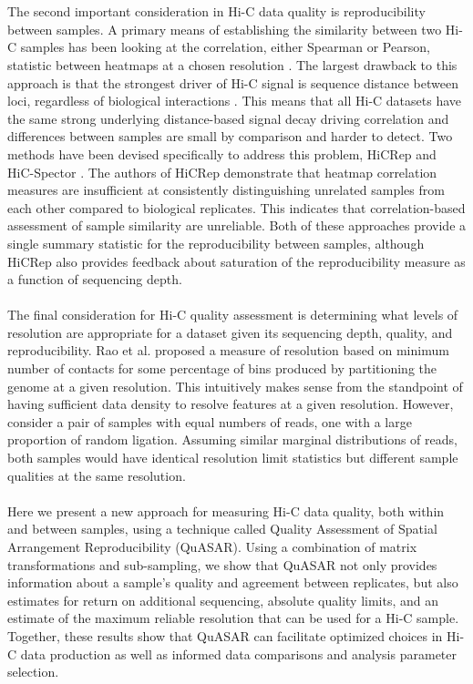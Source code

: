 \\\\
The second important consideration in Hi-C data quality is reproducibility between samples. A primary means of establishing the similarity between two Hi-C samples has been looking at the correlation, either Spearman or Pearson, statistic between heatmaps at a chosen resolution \cite{hou_gene_2012,battulin_comparison_2015,crane_condensin-driven_2015,li_widespread_2015,nagano_comparison_2015,rao_3d_2014}. The largest drawback to this approach is that the strongest driver of Hi-C signal is sequence distance between loci, regardless of biological interactions \cite{lieberman-aiden_comprehensive_2009}. This means that all Hi-C datasets have the same strong underlying distance-based signal decay driving correlation and differences between samples are small by comparison and harder to detect. Two methods have been devised specifically to address this problem, HiCRep \cite{yang_hicrep:_2017} and HiC-Spector \cite{yan_hic-spector:_2017}. The authors of HiCRep demonstrate that heatmap correlation measures are insufficient at consistently distinguishing unrelated samples from each other compared to biological replicates. This indicates that correlation-based assessment of sample similarity are unreliable. Both of these approaches provide a single summary statistic for the reproducibility between samples, although HiCRep also provides feedback about saturation of the reproducibility measure as a function of sequencing depth.
\\\\
The final consideration for Hi-C quality assessment is determining what levels of resolution are appropriate for a dataset given its sequencing depth, quality, and reproducibility. Rao et al. \cite{rao_3d_2014} proposed a measure of resolution based on minimum number of contacts for some percentage of bins produced by partitioning the genome at a given resolution. This intuitively makes sense from the standpoint of having sufficient data density to resolve features at a given resolution. However, consider a pair of samples with equal numbers of reads, one with a large proportion of random ligation. Assuming similar marginal distributions of reads, both samples would have identical resolution limit statistics but different sample qualities at the same resolution.
\\\\
Here we present a new approach for measuring Hi-C data quality, both within and between samples, using a technique called Quality Assessment of Spatial Arrangement Reproducibility (QuASAR). Using a combination of matrix transformations and sub-sampling, we show that QuASAR not only provides information about a sample's quality and agreement between replicates, but also estimates for return on additional sequencing, absolute quality limits, and an estimate of the maximum reliable resolution that can be used for a Hi-C sample. Together, these results show that QuASAR can facilitate optimized choices in Hi-C data production as well as informed data comparisons and analysis parameter selection.

